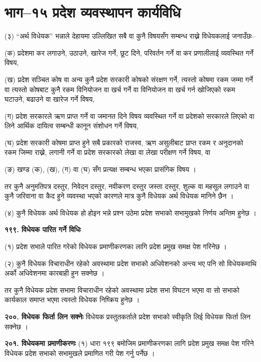 \section{भाग–१५ प्रदेश व्यवस्थापन कार्यविधि}

(३) “अर्थ विधेयक” भन्नाले देहायमा उल्लिखित सबै वा कुनै विषयसँग सम्बन्ध राख्ने विधेयकलाई जनाउँछः–

(क) प्रदेशमा कर लगाउने, उठाउने, खारेज गर्ने, छूट दिने, परिवर्तन गर्ने वा कर प्रणालीलाई व्यवस्थित गर्ने विषय,

(ख) प्रदेश सञ्चित कोष वा अन्य कुनै प्रदेश सरकारी कोषको संरक्षण गर्ने, त्यस्तो कोषमा रकम जम्मा गर्ने वा त्यस्तो कोषबाट कुनै रकम विनियोजन वा खर्च गर्ने वा विनियोजन वा खर्च गर्न खोजिएको रकम घटाउने, बढाउने वा खारेज गर्ने विषय,

(ग) प्रदेश सरकारले ऋण प्राप्त गर्ने वा जमानत दिने विषय व्यवस्थित गर्ने वा प्रदेशको सरकारले लिएको वा लिने आर्थिक दायित्व सम्बन्धी कानून संशोधन गर्ने विषय,

(घ) प्रदेश सरकारी कोषमा प्राप्त हुने सबै प्रकारको राजस्व, ऋण असुलीबाट प्राप्त रकम र अनुदानको रकम जिम्मा राख्ने, लगानी गर्ने वा प्रदेश सरकारको लेखा वा लेखा परीक्षण गर्ने विषय, वा

(ङ) खण्ड (क), (ख), (ग) वा (घ) सँग प्रत्यक्ष सम्बन्ध भएका प्रासंगिक विषय ।

तर कुनै अनुमतिपत्र दस्तुर, निवेदन दस्तुर, नवीकरण दस्तुर जस्ता दस्तुर, शुल्क वा महसूल लगाउने वा कुनै जरिवाना वा कैद हुने व्यवस्था
भएको कारणले मात्र कुनै विधेयक अर्थ विधेयक मानिने छैन ।

(४) कुनै विधेयक अर्थ विधेयक हो होइन भन्ने प्रश्न उठेमा प्रदेश सभाको सभामुखको निर्णय अन्तिम हुनेछ ।

\textbf{१९९. विधेयक पारित गर्ने विधिः}

(१) प्रदेश सभाले पारित गरेको विधेयक प्रमाणीकरणका लागि प्रदेश प्रमुख समक्ष पेश गरिनेछ ।

(२) कुनै विधेयक विचाराधीन रहेको अवस्थामा प्रदेश सभाको अधिवेशनको अन्त्य भए पनि सो विधेयकमाथि अर्को अधिवेशनमा कारबाही
हुन सक्नेछ ।

तर कुनै विधेयक प्रदेश सभामा विचाराधीन रहेको अवस्थामा प्रदेश सभा विघटन भएमा वा सो सभाको कार्यकाल समाप्त भएमा त्यस्तो विधेयक निष्क्रिय हुनेछ ।

\textbf{२००. विधेयक फिर्ता लिन सक्नेः} विधेयक प्रस्तुतकर्ताले प्रदेश सभाको स्वीकृति लिई विधेयक फिर्ता लिन सक्नेछ ।

\textbf{२०१. विधेयकमा प्रमाणीकरणः} (१) धारा १९९ बमोजिम प्रमाणीकरणका लागि प्रदेश प्रमुख समक्ष पेश गरिने विधेयक प्रदेश सभाको सभामुखले प्रमाणित गरी पेश गर्नु पर्नेछ ।

